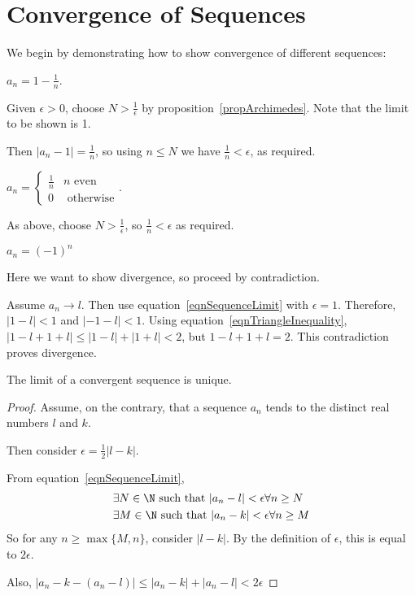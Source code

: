\documentclass[../Main.tex]{subfiles}
\begin{document}
\section{Convergence of Sequences}
We begin by demonstrating how to show convergence of different sequences:
\begin{examples}{}
    \item $a_n = 1-\frac{1}{n}$.\par
        Given $\epsilon > 0$, choose $N > \frac{1}{\epsilon}$ by proposition~\ref{propArchimedes}. Note that the limit to be shown is 1.\par
        Then $|a_n - 1| = \frac{1}{n}$, so using $n \leq N$ we have $\frac{1}{n} < \epsilon$, as required.
    \item $a_n = \begin{cases}\frac{1}{n} & n \text{ even} \\ 0 & \text{ otherwise}\end{cases}$.\par
        As above, choose $N > \frac{1}{\epsilon}$, so $\frac{1}{n} < \epsilon$ as required.
    \item $a_n = (-1)^n$\par
        Here we want to show divergence, so proceed by contradiction.\par
        Assume $a_n \rightarrow l$. Then use equation~\ref{eqnSequenceLimit} with $\epsilon = 1$. Therefore, $|1-l| < 1$ and $|-1-l| < 1$. Using equation~\ref{eqnTriangleInequality}, $|1 - l + 1 + l| \leq |1 - l| + |1 + l| < 2$, but $1 - l + 1 + l = 2$. This contradiction proves divergence.
\end{examples}
\begin{lemma}
    The limit of a convergent sequence is unique.
    \label{lemUniqueLimit}
\end{lemma}
\begin{proof}
    Assume, on the contrary, that a sequence $a_n$ tends to the distinct real numbers $l$ and $k$.\par
    Then consider $\epsilon = \frac{1}{2} |l - k|$.\par
    From equation~\ref{eqnSequenceLimit},
    \begin{align*}
        &\exists N \in \N \text{ such that } |a_n - l| < \epsilon \forall n \geq N \\
        &\exists M \in \N \text{ such that } |a_n - k| < \epsilon \forall n \geq M
    \end{align*}
    So for any $n \geq \max{\{M, n\}}$, consider $|l - k|$. By the definition of $\epsilon$, this is equal to $2\epsilon$.\par
    Also, $|a_n - k - (a_n - l)| \leq |a_n - k| + |a_n - l| < 2\epsilon$ \contradiction
\end{proof}
\end{document}
